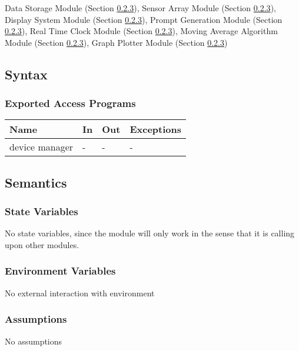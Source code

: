 \documentclass[12pt, titlepage]{article}
\begin{document}
Data Storage Module (Section \ref{}), Sensor Array Module (Section \ref{}), Display System Module (Section \ref{}), Prompt Generation Module (Section \ref{}), Real Time Clock Module (Section \ref{}), Moving Average Algorithm Module (Section \ref{}), Graph Plotter Module (Section \ref{})

\subsection{Syntax}

\subsubsection{Exported Access Programs}

\begin{center}
\begin{tabular}{p{2cm} p{4cm} p{4cm} p{2cm}}
\hline
\textbf{Name} & \textbf{In} & \textbf{Out} & \textbf{Exceptions} \\
\hline
device manager & - & - & - \\
\hline
\end{tabular}
\end{center}

\subsection{Semantics}

\subsubsection{State Variables}


No state variables, since the module will only work in the sense that it is calling upon other modules. 

\subsubsection{Environment Variables}

No external interaction with environment

\subsubsection{Assumptions}

No assumptions
\end{document}
